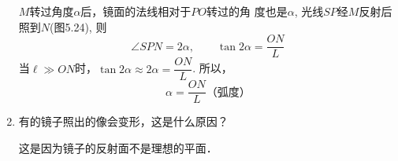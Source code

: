 \begin{enumerate}
    \begin{solution}
        $M$转过角度$\alpha$后，镜面的法线相对于$PO$转过的角
        度也是$\alpha$, 光线$SP$经$M$反射后照到$N$(图5.24), 则
\[\angle SPN=2\alpha,\qquad \tan2\alpha=\frac{ON}{L}\] 
当$\ell\gg ON$时，$\tan 2\alpha\approx 2\alpha=\dfrac{ON}{L}$. 所以，
\[\alpha=\dfrac{ON}{L}\text{（弧度）}\]
    \end{solution}

    \item 有的镜子照出的像会变形，这是什么原因？
    
    \begin{solution}
        这是因为镜子的反射面不是理想的平面．
    \end{solution}
\end{enumerate}






